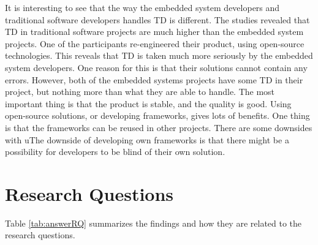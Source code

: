 It is interesting to see that the way the embedded system developers and traditional software developers handles TD is different. The studies revealed that TD in traditional software projects are much higher than the embedded system projects. One of the participants re-engineered their product, using open-source technologies. This reveals that TD is taken much more seriously by the embedded system developers. One reason for this is that their solutions cannot contain any errors. However, both of the embedded systems projects have some TD in their project, but nothing more than what they are able to handle. The most important thing is that the product is stable, and the quality is good. Using open-source solutions, or developing frameworks, gives lots of benefits. One thing is that the frameworks can be reused in other projects. There are some downsides with uThe downside of developing own frameworks is that there might be a possibility for developers to be blind of their own solution.



\section{Research Questions}
Table \ref{tab:answerRQ} summarizes the findings and how they are related to the research questions. 

